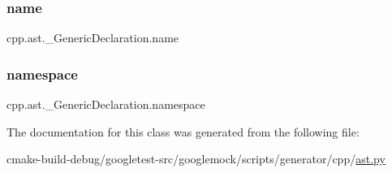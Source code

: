 \subsubsection{\texorpdfstring{name}{name}}
{\footnotesize\ttfamily cpp.\+ast.\+\_\+\+Generic\+Declaration.\+name}

\mbox{\label{classcpp_1_1ast_1_1__GenericDeclaration_a8aee3f11b37449d54b42a78e0a689f46}} 
\subsubsection{\texorpdfstring{namespace}{namespace}}
{\footnotesize\ttfamily cpp.\+ast.\+\_\+\+Generic\+Declaration.\+namespace}



The documentation for this class was generated from the following file\+:\begin{DoxyCompactItemize}
\item 
cmake-\/build-\/debug/googletest-\/src/googlemock/scripts/generator/cpp/\mbox{\hyperlink{ast_8py}{ast.\+py}}\end{DoxyCompactItemize}
